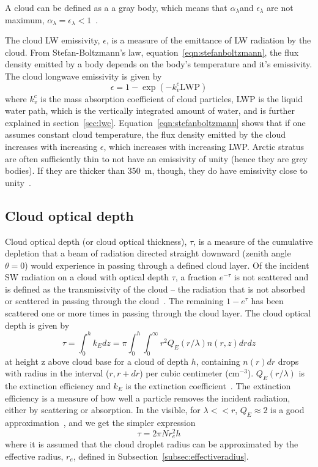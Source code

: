A cloud can be defined as a a gray body, which means that $\alpha_{\lambda}$and $\epsilon_{\lambda}$ are not maximum, $\alpha_{\lambda}=\epsilon_{\lambda}<1$~\citep{Liou2002}.

The cloud LW emissivity, $\epsilon$, is a measure of the emittance of LW radiation by the cloud. From Stefan-Boltzmann's law, equation~\ref{eqn:stefanboltzmann}, the flux density emitted by a body depends on the body's temperature and it's emissivity. The cloud longwave emissivity is given by~\cite{Liou1992}
\begin{equation}
\epsilon = 1 - \exp(-k_v^c \text{LWP})
\label{eqn:epsilon_lw}
\end{equation}
where $k_v^c$ is the mass absorption coefficient of cloud particles, LWP is the liquid water path, which is the vertically integrated amount of water, and is further explained in section~\ref{sec:lwc}. Equation~\ref{eqn:stefanboltzmann} shows that if one assumes constant cloud temperature, the flux density emitted by the cloud increases with increasing $\epsilon$, which increases with increasing LWP. Arctic stratus are often sufficiently thin to not have an emissivity of unity (hence they are grey bodies). If they are thicker than 350~m, though, they do have emissivity close to unity~\citep{Herman1980}. %

\subsection{Cloud optical depth}
\label{sec:cloudoptdep}
Cloud optical depth (or cloud optical thickness), $\tau$, is a measure of the cumulative depletion that a beam of radiation directed straight downward (zenith angle $\theta = 0$) would experience in passing through a defined cloud layer. Of the incident SW radiation on a cloud with optical depth $\tau$, a fraction $e^{-\tau}$ is not scattered and is defined as the transmissivity of the cloud -- the radiation that is not absorbed or scattered in passing through the cloud~\citep{Wallace2006}. The remaining $1-e^{\tau}$ has been scattered one or more times in passing through the cloud layer. The cloud optical depth is given by~\citep{Twomey1977}
\begin{equation}
\tau = \int_0^h k_{E}dz = \pi \int_0^h \int_0^{\infty} r^2 Q_E(r/\lambda) n(r,z) dr dz
\end{equation}
at height z above cloud base for a cloud of depth $h$, containing $n(r)dr$ drops with radius in the interval ($r, r + dr$) per cubic centimeter ($\text{cm}^{-3}$). $Q_E(r/\lambda)$ is the extinction efficiency and $k_{E}$ is the extinction coefficient~\citep{Twomey1977}. The extinction efficiency is a measure of how well a particle removes the incident radiation, either by scattering or absorption. In the visible, for $\lambda<<r$, $Q_E\approx 2$ is a good approximation~\citep{Hobbs1993}, and we get the simpler expression
\begin{equation}
\tau = 2\pi N r_e^2 h
\label{eqn:cloudtau1}
\end{equation}
where it is assumed that the cloud droplet radius can be approximated by the effective radius, $r_e$, defined in Subsection~\ref{subsec:effectiveradius}.

